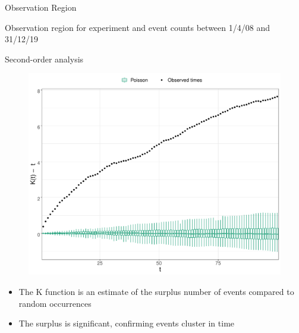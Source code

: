 \documentclass{beamer}
\begin{document}
\begin{frame}{Observation Region}
\begin{figure}
    \centering
\end{figure}
Observation region for experiment and event counts between 1/4/08 and 31/12/19
\end{frame}

\begin{frame}{Second-order analysis}
\begin{figure}
\centering
\includegraphics[width = 0.6\linewidth]{figures/Kfuncs.pdf}
\end{figure}
\begin{itemize}
\item The K function is an estimate of the surplus number of events compared to random occurrences
\item The surplus is significant, confirming events cluster in time
\end{itemize}
\end{frame}
\end{document}
